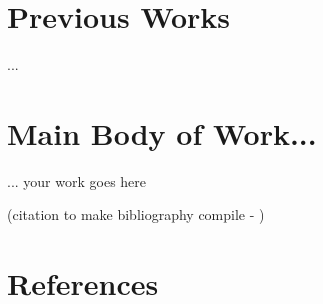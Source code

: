 \documentclass[12pt]{article}
\begin{document}
\section{Previous Works}
...

\section{Main Body of Work...}
... your work goes here 

(citation to make bibliography compile - \cite{GUTEETAL09,KAMMETAL17,KAMMETAL18})



\newpage

\section{References}
\renewcommand*{\refname}{ }




\newpage
\end{document}

